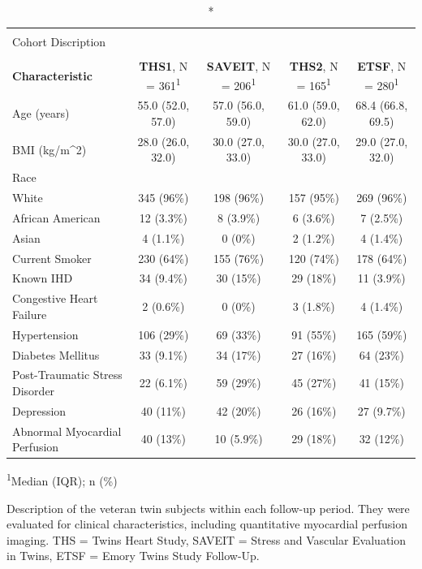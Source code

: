 \documentclass[
  11pt,
  openany]{book}
\begin{document}
\captionsetup[table]{labelformat=empty,skip=1pt}
\begin{longtable}{lcccc}
\caption*{
\large Emory Twins Study\\ 
\small Cohort Discription\\ 
} \\ 
\toprule
\textbf{Characteristic} & \textbf{THS1}, N = 361\textsuperscript{1} & \textbf{SAVEIT}, N = 206\textsuperscript{1} & \textbf{THS2}, N = 165\textsuperscript{1} & \textbf{ETSF}, N = 280\textsuperscript{1} \\ 
\midrule
Age (years) & 55.0 (52.0, 57.0) & 57.0 (56.0, 59.0) & 61.0 (59.0, 62.0) & 68.4 (66.8, 69.5) \\ 
BMI (kg/m\textasciicircum 2) & 28.0 (26.0, 32.0) & 30.0 (27.0, 33.0) & 30.0 (27.0, 33.0) & 29.0 (27.0, 32.0) \\ 
Race &  &  &  &  \\ 
White & 345 (96\%) & 198 (96\%) & 157 (95\%) & 269 (96\%) \\ 
African American & 12 (3.3\%) & 8 (3.9\%) & 6 (3.6\%) & 7 (2.5\%) \\ 
Asian & 4 (1.1\%) & 0 (0\%) & 2 (1.2\%) & 4 (1.4\%) \\ 
Current Smoker & 230 (64\%) & 155 (76\%) & 120 (74\%) & 178 (64\%) \\ 
Known IHD & 34 (9.4\%) & 30 (15\%) & 29 (18\%) & 11 (3.9\%) \\ 
Congestive Heart Failure & 2 (0.6\%) & 0 (0\%) & 3 (1.8\%) & 4 (1.4\%) \\ 
Hypertension & 106 (29\%) & 69 (33\%) & 91 (55\%) & 165 (59\%) \\ 
Diabetes Mellitus & 33 (9.1\%) & 34 (17\%) & 27 (16\%) & 64 (23\%) \\ 
Post-Traumatic Stress Disorder & 22 (6.1\%) & 59 (29\%) & 45 (27\%) & 41 (15\%) \\ 
Depression & 40 (11\%) & 42 (20\%) & 26 (16\%) & 27 (9.7\%) \\ 
Abnormal Myocardial Perfusion & 40 (13\%) & 10 (5.9\%) & 29 (18\%) & 32 (12\%) \\ 
\bottomrule
\end{longtable}
\vspace{-5mm}
\begin{minipage}{\linewidth}
\textsuperscript{1}Median (IQR); n (\%) \\ 
\end{minipage}
\begin{minipage}{\linewidth}
Description of the veteran twin subjects within each follow-up period. They were evaluated for clinical characteristics, including quantitative myocardial perfusion imaging. THS = Twins Heart Study, SAVEIT = Stress and Vascular Evaluation in Twins, ETSF = Emory Twins Study Follow-Up.\\ 
\end{minipage}
\end{document}
